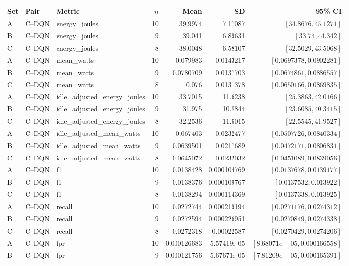 \small\begin{longtable}{lllrrrr}\toprule Set & Pair & Metric & $n$ & Mean & SD & 95\% CI\\\midrule\endhead
A & C--DQN & energy\_joules & 10 & 39.9974 & 7.17087 & $[34.8676,45.1271]$\\
B & C--DQN & energy\_joules & 9 & 39.041 & 6.89631 & $[33.74,44.342]$\\
C & C--DQN & energy\_joules & 8 & 38.0048 & 6.58107 & $[32.5029,43.5068]$\\
A & C--DQN & mean\_watts & 10 & 0.079983 & 0.0143217 & $[0.0697378,0.0902281]$\\
B & C--DQN & mean\_watts & 9 & 0.0780709 & 0.0137703 & $[0.0674861,0.0886557]$\\
C & C--DQN & mean\_watts & 8 & 0.076 & 0.0131378 & $[0.0650166,0.0869835]$\\
A & C--DQN & idle\_adjusted\_energy\_joules & 10 & 33.7015 & 11.6238 & $[25.3863,42.0166]$\\
B & C--DQN & idle\_adjusted\_energy\_joules & 9 & 31.975 & 10.8844 & $[23.6085,40.3415]$\\
C & C--DQN & idle\_adjusted\_energy\_joules & 8 & 32.2536 & 11.6015 & $[22.5545,41.9527]$\\
A & C--DQN & idle\_adjusted\_mean\_watts & 10 & 0.067403 & 0.0232477 & $[0.0507726,0.0840334]$\\
B & C--DQN & idle\_adjusted\_mean\_watts & 9 & 0.0639501 & 0.0217689 & $[0.0472171,0.0806831]$\\
C & C--DQN & idle\_adjusted\_mean\_watts & 8 & 0.0645072 & 0.0232032 & $[0.0451089,0.0839056]$\\
A & C--DQN & f1 & 10 & 0.0138428 & 0.000104769 & $[0.0137678,0.0139177]$\\
B & C--DQN & f1 & 9 & 0.0138376 & 0.000109767 & $[0.0137532,0.013922]$\\
C & C--DQN & f1 & 8 & 0.0138294 & 0.000114369 & $[0.0137338,0.013925]$\\
A & C--DQN & recall & 10 & 0.0272744 & 0.000219194 & $[0.0271176,0.0274312]$\\
B & C--DQN & recall & 9 & 0.0272594 & 0.000226951 & $[0.0270849,0.0274338]$\\
C & C--DQN & recall & 8 & 0.0272318 & 0.00022587 & $[0.0270429,0.0274206]$\\
A & C--DQN & fpr & 10 & 0.000126683 & 5.57419e-05 & $[8.68071e-05,0.000166558]$\\
B & C--DQN & fpr & 9 & 0.000121756 & 5.67671e-05 & $[7.81209e-05,0.000165391]$\\

\end{longtable}
